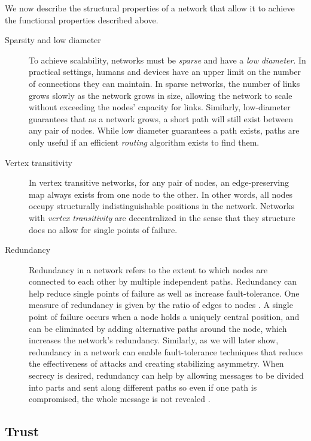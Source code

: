 \documentclass[prodmode,permissions]{acmsmall-ec16}
\begin{document}
We now describe the structural properties of a network that allow it to achieve the functional properties described above. 
\begin{description}
\item [Sparsity and low diameter]
To achieve scalability, networks must be {\em sparse} and have a
{\em low diameter}.
In practical settings, humans and devices have an upper limit on the number
of connections they can maintain.
In sparse networks, the number of links grows slowly as the network grows in
size, allowing the network to scale without exceeding the nodes' capacity for
links.
Similarly, low-diameter guarantees that as a network grows, a short path will
still exist between any pair of nodes.
While low diameter guarantees a path exists,
paths are only useful if an efficient {\em routing} algorithm exists
to find them.

\item [Vertex transitivity]
In vertex transitive networks, for any pair of nodes, an edge-preserving map
always exists from one node to the other.
In other words, all nodes occupy structurally indistinguishable positions
in the network. Networks with {\em vertex transitivity} are decentralized in the sense that they structure does no allow for  single points of failure.

\item [Redundancy]
Redundancy in a network refers to the extent to which nodes are connected to each other by multiple independent paths. Redundancy can help reduce single points of failure as well as
increase fault-tolerance.
One measure of redundancy is given by the ratio of edges to nodes
\cite{baran_distributed_1964}.
A single point of failure occurs when a node holds a uniquely
central position,
and can be eliminated by adding alternative
paths around the node,
which increases the network's redundancy.
Similarly, as we will later show, redundancy in a network can enable fault-tolerance techniques
that reduce the effectiveness of attacks and creating stabilizing asymmetry.
When secrecy is desired, redundancy can help by allowing messages to be
divided into parts and sent along different paths so even if one path is
compromised, the whole message is not revealed \cite{}. 

\end{description}

\subsection{Trust}
\end{document}
